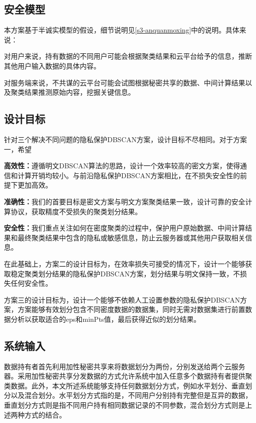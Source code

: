 \subsection{安全模型}
本方案基于半诚实模型的假设，细节说明见\ref{s3-anquanmoxing}中的说明。具体来说：

对用户来说，持有数据的不同用户可能会根据聚类结果和云平台给予的信息，推断其他用户输入数据的具体内容。

对服务端来说，不共谋的云平台可能会试图根据秘密共享的数据、中间计算结果以及聚类结果推测原始内容，挖掘关键信息。
\subsection{设计目标}
针对三个解决不同问题的隐私保护DBSCAN方案，设计目标不尽相同。对于方案一，希望
\begin{compactitem}
	\item\textbf{高效性：}遵循明文DBSCAN算法的思路，设计一个效率较高的密文方案，使得通信和计算开销均较小。与前沿隐私保护DBSCAN方案相比，在不损失安全性的前提下更加高效。
	\item\textbf{准确性：}我们的首要目标是密文方案与明文方案聚类结果一致，设计可靠的安全计算协议，获取精度不受损失的聚类划分结果。
	\item\textbf{安全性：}我们重点关注如何在密度聚类的过程中，保护用户原始数据、中间计算结果和最终聚类结果中包含的隐私或敏感信息，防止云服务器或其他用户获取相关信息。
\end{compactitem}

在此基础上，方案二的设计目标为，在效率损失可接受的情况下，设计一个能够获取稳定聚类划分结果的隐私保护DBSCAN方案，划分结果与明文保持一致，不损失任何安全性。

方案三的设计目标为，设计一个能够不依赖人工设置参数的隐私保护DBSCAN方案，方案能够有效划分包含不同密度数据的数据集，同时无需对数据集进行前置数据分析以获取适合的eps和minPts值，最后获得近似的划分结果。

\subsection{系统输入}
数据持有者首先利用加性秘密共享来将数据划分为两份，分别发送给两个云服务器。采用加性秘密共享分发数据的方式允许系统中加入任意多个数据持有者提供聚类数据。此外，本文所述系统能够支持任何数据划分方式，例如水平划分、垂直划分以及混合划分。水平划分方式指的是，不同用户分别持有完整但是互异的数据\cite{gheid2016efficient}，垂直划分方式则是指不同用户持有相同数据记录的不同参数\cite{doganay2008distributed}，混合划分方式则是上述两种方式的结合\cite{yu2010multi}。
